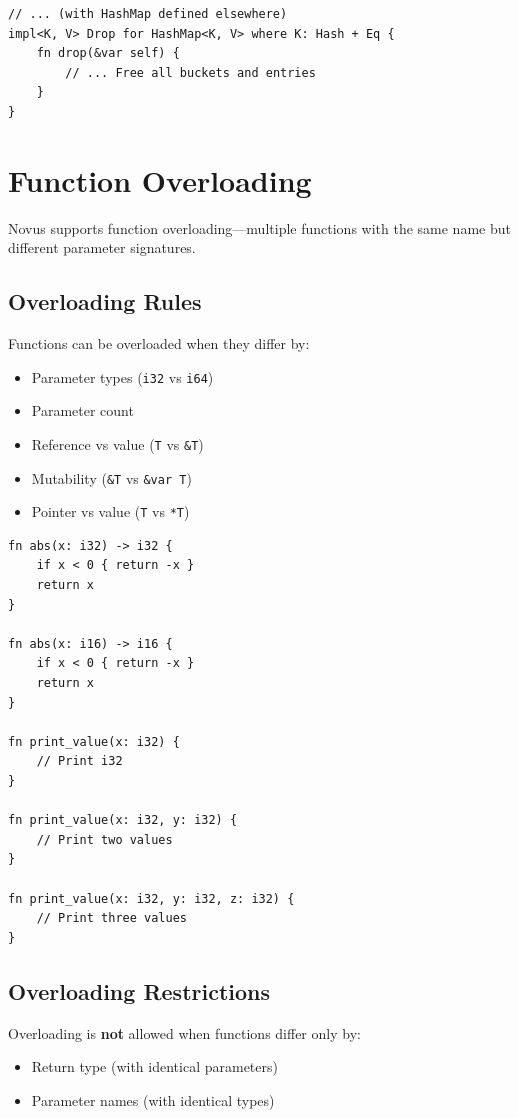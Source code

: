\begin{lstlisting}
// ... (with HashMap defined elsewhere)
impl<K, V> Drop for HashMap<K, V> where K: Hash + Eq {
    fn drop(&var self) {
        // ... Free all buckets and entries
    }
}
\end{lstlisting}

\section{Function Overloading}
\label{sec:overloading}

Novus supports function overloading---multiple functions with the same name but different parameter signatures.

\subsection{Overloading Rules}
\label{subsec:overload-rules}

Functions can be overloaded when they differ by:
\begin{itemize}
    \item Parameter types (\texttt{i32} vs \texttt{i64})
    \item Parameter count
    \item Reference vs value (\texttt{T} vs \texttt{\&T})
    \item Mutability (\texttt{\&T} vs \texttt{\&var T})
    \item Pointer vs value (\texttt{T} vs \texttt{*T})
\end{itemize}

\begin{lstlisting}
fn abs(x: i32) -> i32 {
    if x < 0 { return -x }
    return x
}

fn abs(x: i16) -> i16 {
    if x < 0 { return -x }
    return x
}

fn print_value(x: i32) {
    // Print i32
}

fn print_value(x: i32, y: i32) {
    // Print two values
}

fn print_value(x: i32, y: i32, z: i32) {
    // Print three values
}
\end{lstlisting}

\subsection{Overloading Restrictions}
\label{subsec:overload-restrictions}

Overloading is \textbf{not} allowed when functions differ only by:
\begin{itemize}
    \item Return type (with identical parameters)
    \item Parameter names (with identical types)
\end{itemize}

